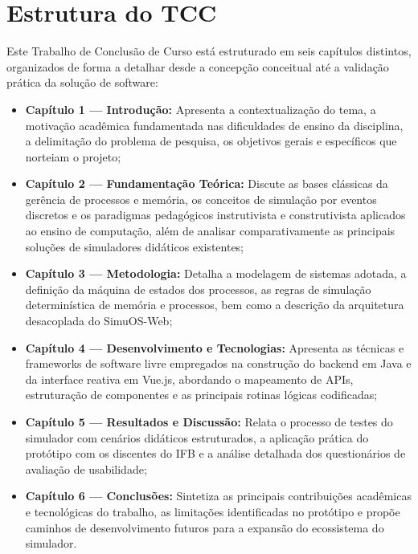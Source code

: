 \section{Estrutura do TCC}
Este Trabalho de Conclusão de Curso está estruturado em seis capítulos distintos, organizados de forma a detalhar desde a concepção conceitual até a validação prática da solução de software:
\begin{itemize}
    \item \textbf{Capítulo 1 --- Introdução:} Apresenta a contextualização do tema, a motivação acadêmica fundamentada nas dificuldades de ensino da disciplina, a delimitação do problema de pesquisa, os objetivos gerais e específicos que norteiam o projeto;
    \item \textbf{Capítulo 2 --- Fundamentação Teórica:} Discute as bases clássicas da gerência de processos e memória, os conceitos de simulação por eventos discretos e os paradigmas pedagógicos instrutivista e construtivista aplicados ao ensino de computação, além de analisar comparativamente as principais soluções de simuladores didáticos existentes;
    \item \textbf{Capítulo 3 --- Metodologia:} Detalha a modelagem de sistemas adotada, a definição da máquina de estados dos processos, as regras de simulação determinística de memória e processos, bem como a descrição da arquitetura desacoplada do SimuOS-Web;
    \item \textbf{Capítulo 4 --- Desenvolvimento e Tecnologias:} Apresenta as técnicas e frameworks de software livre empregados na construção do backend em Java e da interface reativa em Vue.js, abordando o mapeamento de APIs, estruturação de componentes e as principais rotinas lógicas codificadas;
    \item \textbf{Capítulo 5 --- Resultados e Discussão:} Relata o processo de testes do simulador com cenários didáticos estruturados, a aplicação prática do protótipo com os discentes do IFB e a análise detalhada dos questionários de avaliação de usabilidade;
    \item \textbf{Capítulo 6 --- Conclusões:} Sintetiza as principais contribuições acadêmicas e tecnológicas do trabalho, as limitações identificadas no protótipo e propõe caminhos de desenvolvimento futuros para a expansão do ecossistema do simulador.
\end{itemize}

